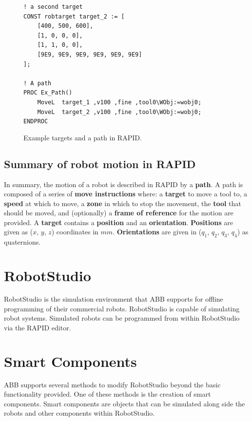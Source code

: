 \documentclass{cslthse-msc}
\begin{document}
\lstset{language=RAPID}
\begin{figure}[H]
\centering
\begin{lstlisting}
! a second target
CONST robtarget target_2 := [ 
    [400, 500, 600], 
    [1, 0, 0, 0], 
    [1, 1, 0, 0], 
    [9E9, 9E9, 9E9, 9E9, 9E9, 9E9] 
];
    
! A path
PROC Ex_Path()
    MoveL  target_1 ,v100 ,fine ,tool0\WObj:=wobj0;
    MoveL  target_2 ,v100 ,fine ,tool0\WObj:=wobj0;
ENDPROC
\end{lstlisting}
\caption{Example targets and a path in RAPID.}
\label{fig:RAPID_target_path}
\end{figure}

\subsection{Summary of robot motion in RAPID}
\label{sec:Tech_Back:Rob_Move:summary}
In summary, the motion of a robot is described in RAPID by a \textbf{path}. A path is composed of a series of \textbf{move instructions} where: a \textbf{target} to move a tool to, a \textbf{speed} at which to move, a \textbf{zone} in which to stop the movement, the \textbf{tool} that should be moved, and (optionally) a \textbf{frame of reference} for the motion are provided. A \textbf{target} contains a \textbf{position} and an \textbf{orientation}. \textbf{Positions} are given as ($x$, $y$, $z$) coordinates in $mm$. \textbf{Orientations} are given in ($q_1$, $q_2$, $q_3$, $q_4$) as quaternions. 


\section{RobotStudio}
\label{sec:Tech_Back:RobotStudio}
RobotStudio is the simulation environment that ABB supports for offline programming of their commercial robots. RobotStudio is capable of simulating robot systems. Simulated robots can be programmed from within RobotStudio via the RAPID editor. 

\section{Smart Components}
\label{sec:Tech_Back:Smart_Comp}
ABB supports several methods to modify RobotStudio beyond the basic functionality provided. One of these methods is the creation of smart components. Smart components are objects that can be simulated along side the robots and other components within RobotStudio. 
\end{document}
